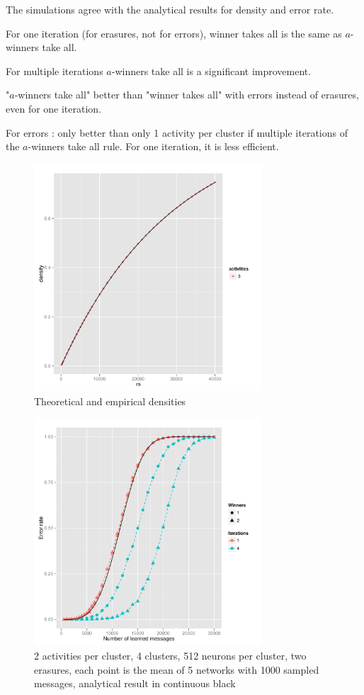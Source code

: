\documentclass[english,11pt,twocolumn]{article}
\theoremstyle{definition}
\begin{document}
		The simulations agree with the analytical results for density and error rate.
	

	For one iteration (for erasures, not for errors), winner takes all is the same as $a$-winners take all.
	
	For multiple iterations $a$-winners take all is a significant improvement.
	
		"$a$-winners take all" better than "winner takes all" with errors instead of erasures, even for one iteration.
	
	For errors : only better than only 1 activity per cluster if multiple iterations of the $a$-winners take all rule.
	For one iteration, it is less efficient.
	\begin{figure}
		\includegraphics[width=8.5cm]{densiteexemple.pdf}
		\caption{Theoretical and empirical densities}
	\end{figure}
	
	\begin{figure}
		\includegraphics[width=8.5cm]{remplacement_figure2g1} %
		\caption{2 activities per cluster, 4 clusters, 512 neurons per cluster, two erasures, each point is the mean of 5 networks with 1000 sampled messages, analytical result in continuous black}
		\end{figure}
			
\end{document}
